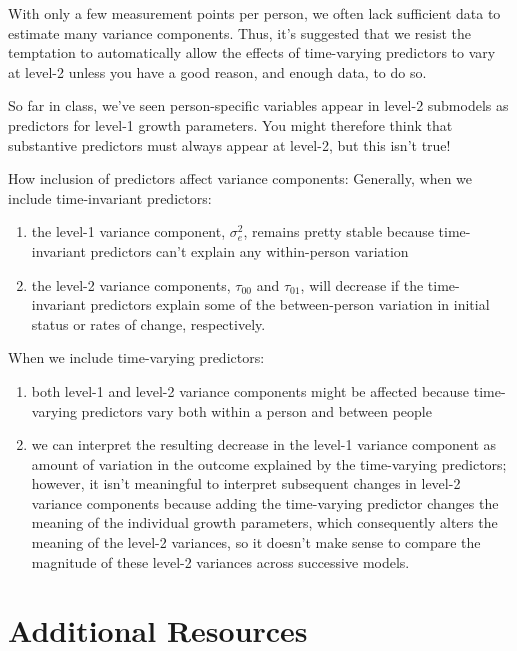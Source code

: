 \documentclass[
  letterpaper,
  DIV=11,
  numbers=noendperiod]{scrreprt}
\begin{document}
With only a few measurement points per person, we often lack sufficient
data to estimate many variance components. Thus, it's suggested that we
resist the temptation to automatically allow the effects of time-varying
predictors to vary at level-2 unless you have a good reason, and enough
data, to do so.

So far in class, we've seen person-specific variables appear in level-2
submodels as predictors for level-1 growth parameters. You might
therefore think that substantive predictors must always appear at
level-2, but this isn't true!

How inclusion of predictors affect variance components: Generally, when
we include time-invariant predictors:

\begin{enumerate}
\def\labelenumi{\arabic{enumi}.}
\item
  the level-1 variance component, \(\sigma^2_e\), remains pretty stable
  because time-invariant predictors can't explain any within-person
  variation
\item
  the level-2 variance components, \(\tau_{00}\) and \(\tau_{01}\), will
  decrease if the time-invariant predictors explain some of the
  between-person variation in initial status or rates of change,
  respectively.
\end{enumerate}

When we include time-varying predictors:

\begin{enumerate}
\def\labelenumi{\arabic{enumi}.}
\item
  both level-1 and level-2 variance components might be affected because
  time-varying predictors vary both within a person and between people
\item
  we can interpret the resulting decrease in the level-1 variance
  component as amount of variation in the outcome explained by the
  time-varying predictors; however, it isn't meaningful to interpret
  subsequent changes in level-2 variance components because adding the
  time-varying predictor changes the meaning of the individual growth
  parameters, which consequently alters the meaning of the level-2
  variances, so it doesn't make sense to compare the magnitude of these
  level-2 variances across successive models.
\end{enumerate}

\section{Additional Resources}\label{additional-resources-1}
\end{document}
